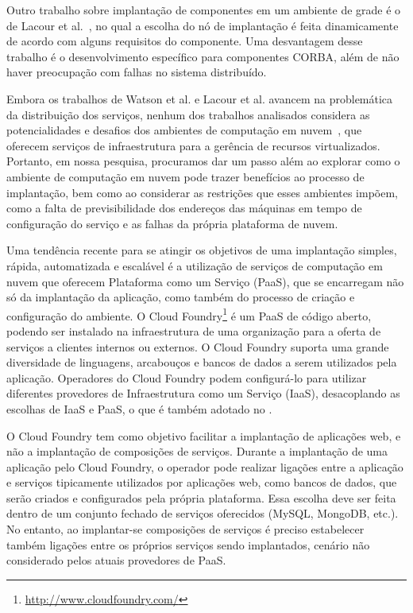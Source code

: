 Outro trabalho sobre implantação de componentes em um ambiente de grade é o de Lacour et al.~\cite{Lacour2004Corba}, no qual a escolha do nó de implantação é feita dinamicamente de acordo com alguns requisitos do componente. Uma desvantagem desse trabalho é o desenvolvimento específico para componentes CORBA, além de não haver preocupação com falhas no sistema distribuído.

Embora os trabalhos de Watson et al. e Lacour et al. avancem na problemática da distribuição dos serviços, nenhum dos trabalhos analisados considera as potencialidades e desafios dos ambientes de computação em nuvem~\cite{Amazon2012Practices}, que oferecem serviços de infraestrutura para a gerência de recursos virtualizados. Portanto, em nossa pesquisa, procuramos dar um passo além ao explorar como o ambiente de computação em nuvem pode trazer benefícios ao processo de implantação, bem como ao considerar as restrições que esses ambientes impõem, como a falta de previsibilidade dos endereços das máquinas em tempo de configuração do serviço e as falhas da própria plataforma de nuvem.


Uma tendência recente para se atingir os objetivos de uma implantação simples, rápida, automatizada e escalável é a utilização de serviços de computação em nuvem que oferecem Plataforma como um Serviço (PaaS), que se encarregam não só da implantação da aplicação, como também do processo de criação e configuração do ambiente. O Cloud Foundry\footnote{\url{http://www.cloudfoundry.com/}} é um PaaS de código aberto, podendo ser instalado na infraestrutura de uma organização para a oferta de serviços a clientes internos ou externos. O Cloud Foundry suporta uma grande diversidade de linguagens, arcabouços e bancos de dados a serem utilizados pela aplicação. Operadores do Cloud Foundry podem configurá-lo para utilizar diferentes provedores de Infraestrutura como um Serviço (IaaS), desacoplando as escolhas de IaaS e PaaS, o que é também adotado no \ee. 

O Cloud Foundry tem como objetivo facilitar a implantação de aplicações web, e não a implantação de composições de serviços. Durante a implantação de uma aplicação pelo Cloud Foundry, o operador pode realizar ligações entre a aplicação e serviços tipicamente utilizados por aplicações web, como bancos de dados, que serão criados e configurados pela própria plataforma. Essa escolha deve ser feita dentro de um conjunto fechado de serviços oferecidos (MySQL, MongoDB, etc.). No entanto, ao implantar-se composições de serviços é preciso estabelecer também ligações entre os próprios serviços sendo implantados, cenário não considerado pelos atuais provedores de PaaS.

